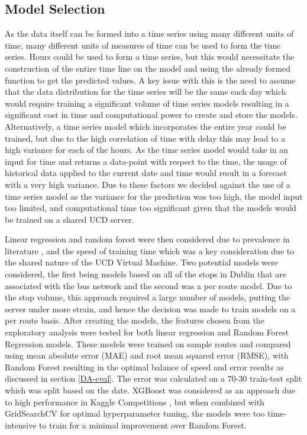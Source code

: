 \documentclass[]{UCD_CS_47360_Report}
\begin{document}
\subsection{Model Selection}
As the data itself can be formed into a time series using many different units of time, many different units of measures of time can be used to form the time series. Hours could be used to form a time series, but this would necessitate the construction of the entire time line on the model and using the already formed function to get the predicted values. A key issue with this is the need to assume that the data distribution for the time series will be the same each day which would require training a significant volume of time series models resulting in a significant cost in time and computational power to create and store the models. Alternatively, a time series model which incorporates the entire year could be trained, but due to the high correlation of time with delay this may lead to a high variance for each of the hours. As the time series model would take in an input for time and returns a data-point with respect to the time, the usage of historical data applied to the current date and time would result in a forecast with a very high variance. Due to these factors we decided against the use of a time series model as the variance for the prediction was too high, the model input too limited, and computational time too significant given that the models would be trained on a shared UCD server.

Linear regression and random forest were then considered due to prevalence in literature \cite{RF}, and the speed of training time which was a key consideration due to the shared nature of the UCD Virtual Machine. Two potential models were considered, the first being models based on all of the stops in Dublin that are associated with the bus network and the second was a per route model. Due to the stop volume, this approach required a large number of models, putting the server under more strain, and hence the decision was made to train models on a per route basis. After creating the models, the features chosen from the exploratory analysis were tested for both linear regression and Random Forest Regression models. These models were trained on sample routes and compared using mean absolute error (MAE) and root mean squared error (RMSE), with Random Forest resulting in the optimal balance of speed and error results as discussed in section \ref{DA-eval}. The error was calculated on a 70-30 train-test split which was split based on the date. XGBoost was considered as an approach due to high performance in Kaggle Competitions \cite{XGB}, but when combined with GridSearchCV for optimal hyperparameter tuning, the models were too time-intensive to train for a minimal improvement over Random Forest.
\end{document}
